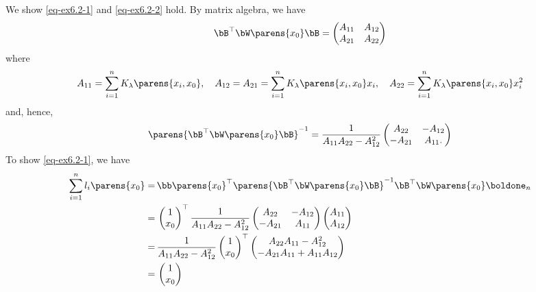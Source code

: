 \documentclass[12pt]{article}
\begin{document}
\begin{enumerate}[label=\textbf{\arabic*.}]
	We show \eqref{eq-ex6.2-1} and \eqref{eq-ex6.2-2} hold. By matrix algebra, we have 
	\begin{align*}
		\bB^\top \bW \parens{x_0} \bB = \begin{pmatrix}
			A_{11} & A_{12} \\ 
			A_{21} & A_{22}
		\end{pmatrix}
	\end{align*}
	where 
	\begin{align*}
		A_{11} = \sum_{i=1}^n K_{\lambda} \parens{x_i, x_0}, \quad A_{12} = A_{21} = \sum_{i=1}^n K_{\lambda} \parens{x_i, x_0} x_i, \quad A_{22} = \sum_{i=1}^n K_{\lambda} \parens{x_i, x_0} x_i^2
	\end{align*}
	and, hence, 
	\begin{align*}
		\parens{\bB^\top \bW \parens{x_0} \bB}^{-1} = \frac{1}{A_{11} A_{22} - A_{12}^2} \begin{pmatrix}
			A_{22} & -A_{12} \\ -A_{21} & A_{11}. 
		\end{pmatrix}
	\end{align*}
	To show \eqref{eq-ex6.2-1}, we have 
	\begin{align*}
		\sum_{i=1}^n l_i \parens{x_0} = & \, \bb \parens{x_0}^\top \parens{\bB^\top \bW \parens{x_0} \bB}^{-1} \bB^\top \bW \parens{x_0} \boldone_n \\ 
		= & \, \begin{pmatrix}
			1 \\ x_0
		\end{pmatrix}^\top \frac{1}{A_{11} A_{22} - A_{12}^2} \begin{pmatrix}
			A_{22} & -A_{12} \\ -A_{21} & A_{11}
		\end{pmatrix} \begin{pmatrix}
			A_{11} \\ A_{12}
		\end{pmatrix} \\ 
		= & \, \frac{1}{A_{11} A_{22} - A_{12}^2} \begin{pmatrix}
			1 \\ x_0
		\end{pmatrix}^\top \begin{pmatrix}
			A_{22} A_{11} - A_{12}^2 \\ 
			-A_{21} A_{11} + A_{11} A_{12}
		\end{pmatrix} \\ 
		= & \, \begin{pmatrix}
			1 \\ x_0

\end{pmatrix}
\end{align*}
\end{enumerate}
\end{document}
